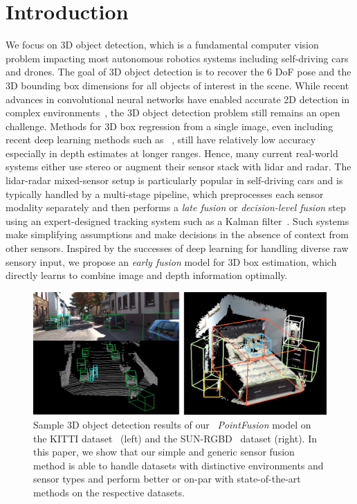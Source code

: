 \documentclass[10pt,twocolumn,letterpaper]{article}
\begin{document}
\section{Introduction}
We focus on 3D object detection, which is a fundamental computer vision problem impacting most autonomous robotics systems including self-driving cars and drones. The goal of 3D object detection is to recover the 6 DoF pose and the 3D bounding box dimensions for all objects of interest in the scene. While recent advances in convolutional neural networks have enabled accurate 2D detection in complex environments~\cite{ren2015faster,lin2017featpyrnet,lin2017focalloss}, the 3D object detection problem still remains an open challenge. Methods for 3D box regression from a single image, even including recent deep learning methods such as ~\cite{mousavian20163d,subcnn}, still have relatively low accuracy especially in depth estimates at longer ranges. Hence, many current real-world systems either use stereo or augment their sensor stack with lidar and radar. The lidar-radar mixed-sensor setup is particularly popular in self-driving cars and is typically handled by a multi-stage pipeline, which preprocesses each sensor modality separately and then performs a \textit{late fusion} or \textit{decision-level fusion} step using an expert-designed tracking system such as a Kalman filter~\cite{cho2014multi,enzweiler2011multilevel}. Such systems make simplifying assumptions and make decisions in the absence of context from other sensors. Inspired by the successes of deep learning for handling diverse raw sensory input, we propose an \textit{early fusion} model for 3D box estimation, which directly learns to combine image and depth information optimally.
 

\begin{figure}[!t]
\centering
\includegraphics[width=\linewidth]{pull-v2.png}
\caption{Sample 3D object detection results of our ~\textit{PointFusion} model on the KITTI dataset~\cite{kitti} (left) and the SUN-RGBD~\cite{song2015sun} dataset (right). In this paper, we show that our simple and generic sensor fusion method is able to handle datasets with distinctive environments and sensor types and perform better or on-par with state-of-the-art methods on the respective datasets. }
\vspace{-10pt}
\label{fig:pull}
\end{figure}
\end{document}
